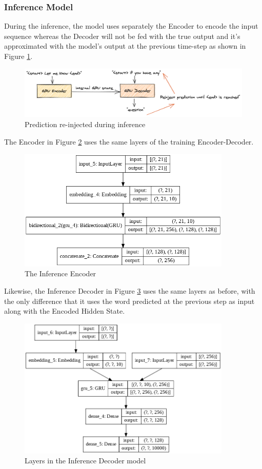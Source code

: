 \documentclass{article}
\begin{document}
\subsubsection{Inference Model}\label{inference-model}

During the inference, the model uses separately the Encoder to encode the input sequence whereas the Decoder will not be fed with the true output and it's approximated with the model's output at the previous time-step as shown in Figure \ref{autoencoder-inference}.

\begin{figure}[htbp]
\centering
\includegraphics[width=7in]{images/autoencoder-inference}
\caption{Prediction re-injected during inference}
\label{autoencoder-inference}
\end{figure}

The Encoder in Figure \ref{encoder} uses the same layers of the training Encoder-Decoder.

\begin{figure}[htbp]
\centering
\includegraphics[width=4in]{images/encoder.png}
\caption{The Inference Encoder}
\label{encoder}
\end{figure}

Likewise, the Inference Decoder in Figure \ref{inf-model} uses the same layers as before, with the only difference that it uses the word predicted at the previous step as input along with the Encoded Hidden State.

\begin{figure}[htbp]
\centering
\includegraphics[width=4in]{images/inf-model.png}
\caption{Layers in the Inference Decoder model}
\label{inf-model}
\end{figure}
\end{document}
